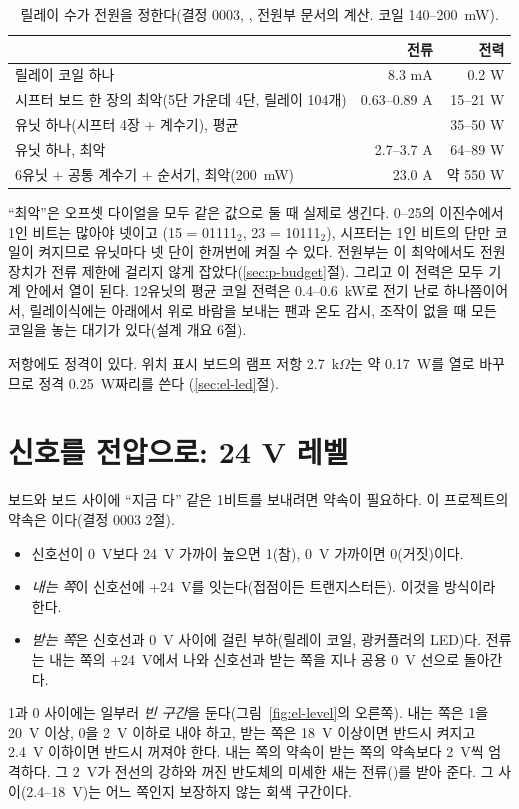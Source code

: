 \begin{table}[ht]
\centering
\caption{릴레이 수가 전원을 정한다(결정 0003, , 전원부 문서의 계산. 코일 140--200~mW).}
\label{tab:el-power}
\small
\begin{tabularx}{\linewidth}{>{\raggedright\arraybackslash}X rr}
\toprule
& 전류 & 전력 \\
\midrule
릴레이 코일 하나 & 8.3 mA & 0.2 W \\
시프터 보드 한 장의 최악(5단 가운데 4단, 릴레이 104개) & 0.63--0.89 A & 15--21 W \\
유닛 하나(시프터 4장 + 계수기), 평균 & & 35--50 W \\
유닛 하나, 최악 & 2.7--3.7 A & 64--89 W \\
6유닛 + 공통 계수기 + 순서기, 최악(200~mW) & 23.0 A & 약 550 W \\
\bottomrule
\end{tabularx}
\end{table}

``최악''은 오프셋 다이얼을 모두 같은 값으로 둘 때 실제로 생긴다. 0--25의 이진수에서 1인 비트는 많아야 넷이고
(15 = 01111$_2$, 23 = 10111$_2$), 시프터는 1인 비트의 단만 코일이 켜지므로 유닛마다 넷 단이 한꺼번에 켜질 수 있다.
전원부는 이 최악에서도 전원 장치가 전류 제한에 걸리지 않게 잡았다(\ref{sec:p-budget}절). 그리고 이 전력은 모두
기계 안에서 열이 된다. 12유닛의 평균 코일 전력은 0.4--0.6~kW로 전기 난로 하나쯤이어서, 릴레이식에는 아래에서
위로 바람을 보내는 팬과 온도 감시, 조작이 없을 때 모든 코일을 놓는 대기가 있다(설계 개요 6절).

저항에도 정격이 있다. 위치 표시 보드의 램프 저항 2.7~k$\Omega$는 약 0.17~W를 열로 바꾸므로 정격 0.25~W짜리를 쓴다
(\ref{sec:el-led}절).

\section{신호를 전압으로: 24 V 레벨}\label{sec:el-level}

\Why 보드와 보드 사이에 ``지금 다'' 같은 1비트를 보내려면 약속이 필요하다. 이 프로젝트의 약속은
이다(결정 0003 2절).
\begin{itemize}
\item 신호선이 0~V보다 24~V 가까이 높으면 1(참), 0~V 가까이면 0(거짓)이다.
\item \emph{내는 쪽}이 신호선에 +24~V를 잇는다(접점이든 트랜지스터든). 이것을  방식이라 한다.
\item \emph{받는 쪽}은 신호선과 0~V 사이에 걸린 부하(릴레이 코일, 광커플러의 LED)다. 전류는 내는 쪽의 +24~V에서
나와 신호선과 받는 쪽을 지나 공용 0~V 선으로 돌아간다.
\end{itemize}
1과 0 사이에는 일부러 \emph{빈 구간}을 둔다(그림~\ref{fig:el-level}의 오른쪽). 내는 쪽은 1을 20~V 이상, 0을 2~V
이하로 내야 하고, 받는 쪽은 18~V 이상이면 반드시 켜지고 2.4~V 이하이면 반드시 꺼져야 한다. 내는 쪽의 약속이
받는 쪽의 약속보다 2~V씩 엄격하다. 그 2~V가 전선의 강하와 꺼진 반도체의 미세한 새는 전류()를
받아 준다. 그 사이(2.4--18~V)는 어느 쪽인지 보장하지 않는 회색 구간이다.

